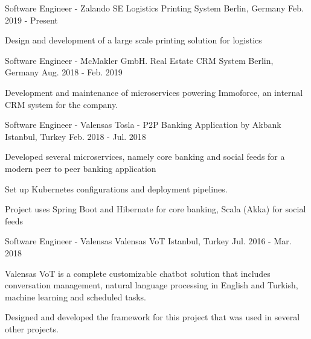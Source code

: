 

\begin{cventries}

  \cventry
    {Software Engineer - Zalando SE}
    {Logistics Printing System}
    {Berlin, Germany}
    {Feb. 2019 - Present}
    {
      \begin{cvitems}
        \item {Design and development of a large scale printing solution for logistics}
      \end{cvitems}
    } 


  \cventry
    {Software Engineer - McMakler GmbH.}
    {Real Estate CRM System}
    {Berlin, Germany}
    {Aug. 2018 - Feb. 2019}
    {
      \begin{cvitems}
        \item {Development and maintenance of microservices powering Immoforce, an internal CRM system for the company.}
      \end{cvitems}
    } 

  \cventry
    {Software Engineer - Valensas}
    {Tosla - P2P Banking Application by Akbank}
    {Istanbul, Turkey}
    {Feb. 2018 - Jul. 2018}
    {
      \begin{cvitems}
        \item {Developed several microservices, namely core banking and social feeds for a modern peer to peer banking application}
        \item {Set up Kubernetes configurations and deployment pipelines.}
        \item {Project uses Spring Boot and Hibernate for core banking, Scala (Akka) for social feeds}
      \end{cvitems}
    } 

  \cventry
    {Software Engineer - Valensas}
    {Valensas VoT}
    {Istanbul, Turkey}
    {Jul. 2016 - Mar. 2018}
    {
      \begin{cvitems}
        \item {Valensas VoT is a complete customizable chatbot solution that includes conversation management, natural language processing in English and Turkish, machine learning and scheduled tasks.}
        \item {Designed and developed the framework for this project that was used in several other projects.}
      \end{cvitems}
    }   
    

\end{cventries}
